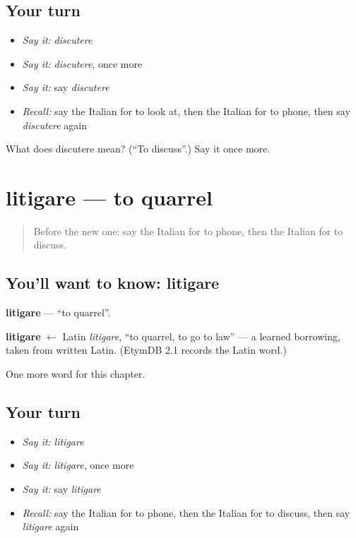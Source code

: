\subsection*{Your turn}
\begin{itemize}
\raggedright
  \item \emph{Say it:} \emph{discutere}
  \item \emph{Say it:} \emph{discutere}, once more
  \item \emph{Say it:} say \emph{discutere}
  \item \emph{Recall:} say the Italian for to look at, then the Italian for to phone, then say \emph{discutere} again
\end{itemize}

\begin{tcolorbox}[breakable,colback=teal!4,colframe=teal!35!black,title={Before you move on}]
What does discutere mean? (\textquotedblleft{}To discuss\textquotedblright{}.) Say it once more.
\end{tcolorbox}
\section[litigare]{litigare — to quarrel}

\label{lesson:IT-C143-litigare}



\begin{quote}
Before the new one: say the Italian for to phone, then the Italian for to discuss.
\end{quote}

\subsection*{You'll want to know: litigare}
\textbf{litigare} — \textquotedblleft{}to quarrel\textquotedblright{}.

\begin{cousinweb}
\textbf{litigare} $\leftarrow$ Latin \emph{litigare}, \textquotedblleft{}to quarrel, to go to law\textquotedblright{} — a learned borrowing, taken from written Latin. (EtymDB 2.1 records the Latin word.)
\end{cousinweb}

\begin{grammarlens}[title={What you've built}]
One more word for this chapter.
\end{grammarlens}

\subsection*{Your turn}
\begin{itemize}
\raggedright
  \item \emph{Say it:} \emph{litigare}
  \item \emph{Say it:} \emph{litigare}, once more
  \item \emph{Say it:} say \emph{litigare}
  \item \emph{Recall:} say the Italian for to phone, then the Italian for to discuss, then say \emph{litigare} again
\end{itemize}

